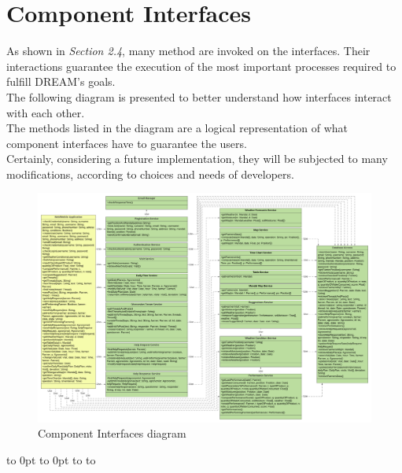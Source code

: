 \section{Component Interfaces}

As shown in \textit{Section 2.4}, many method are invoked on the interfaces. Their interactions guarantee the execution of the most important processes required to fulfill DREAM's goals.\\
The following diagram is presented to better understand how interfaces interact with each other. \\
The methods listed in the  diagram are a logical representation of what component interfaces have to guarantee the users. \\
Certainly, considering a future implementation, they will be subjected to many modifications, according to choices and needs of developers. 

\def\fillandplacepagenumber{%
 \par\pagestyle{empty}%
\vbox to 0pt{\vss}\vfill
\vbox to 0pt{\baselineskip0pt
   \hbox to\linewidth{\hss}%
   \setlength{\footskip}{70pt}
   \baselineskip\footskip
   \hbox to\linewidth{%
     \hfil\thepage\hfil}\vss}}

\begin{landscape}
\begin{figure}[h]
\vspace*{-2cm}
\noindent
\centering
\centerline{\includegraphics[scale = 0.09]{./Images/Component Interfaces.png}}
\vspace*{-1cm}
    \caption{Component Interfaces diagram}
    \vspace*{-12cm}
\end{figure}
\fillandplacepagenumber
\end{landscape}